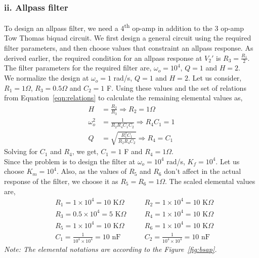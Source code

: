 \documentclass{lab_sheet}
\newcommand\ddfrac[2]{\frac{\displaystyle #1}{\displaystyle #2}}
\begin{document}
\subsubsection*{ii. Allpass filter}
To design an allpass filter, we need a 4\textsuperscript{th} op-amp in addition to the 3 op-amp Tow Thomas biquad circuit. We first design a general circuit using the required filter parameters, and then choose values that constraint an allpass response. As derived earlier, the required condition for an allpass response at $V_2'$ is $R_3=\ddfrac{R_1}{2}$.\\
The filter parameters for the required filter are, $\omega_o=10^4$, $Q=1$ and $H=2$.\\
We normalize the design at $\omega_o=1$ rad/s, $Q=1$ and $H=2$. Let us consider, $R_1=1\Omega$, $R_3=0.5\Omega$ and $C_2=1$ F. Using these values and the set of relations from Equation~\ref{eqn:relations} to calculate the remaining elemental values as,
\begin{equation*}
    \begin{aligned}
        H&=\frac{R_2}{R_3}\Rightarrow R_2=1\Omega\\
       \omega_o^2&=\frac{1}{R_2R_4C_1C_2}\Rightarrow R_4C_1=1\\
       Q&=\sqrt{\frac{R_1^2C_1}{R_2R_4C_2}}\Rightarrow R_4=C_1
    \end{aligned}
\end{equation*}
Solving for $C_1$ and $R_4$, we get, $C_1=1$ F and  $R_4=1\Omega$.\\
Since the problem is to design the filter at $\omega_o=10^4$ rad/s, $K_f=10^4$. Let us choose $K_m=10^4$. Also, as the values of $R_5$ and $R_6$ don't affect in the actual response of the filter, we choose it as $R_5=R_6=1\Omega$. The scaled elemental values are,
 \begin{equation*}
    \begin{aligned}
       &R_1=1\times10^4=10 \text{ K}\Omega \quad &&R_2=1\times10^4=10 \text{ K}\Omega\\
       &R_3=0.5\times10^4=5 \text{ K}\Omega \quad &&R_4=1\times10^4=10 \text{ K}\Omega\\
       &R_5=1\times10^4=10 \text{ K}\Omega \quad &&R_6=1\times10^4=10 \text{ K}\Omega\\
       &C_1= \frac{1}{10^4\times10^4}=10\text{ nF} \quad && 
       C_2= \frac{1}{10^4\times10^4}=10\text{ nF}
    \end{aligned}
\end{equation*}
\textit{Note: The elemental notations are according to the Figure~\ref{fig:bsap}.}
\end{document}
